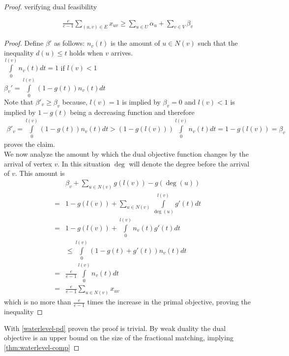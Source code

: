 \begin{proof}
	verifying dual feasibility\\
	\begin{lemma}
		\label{waterlevel-pd}
		\begin{align*}
			\frac{e}{e-1}\sum\limits_{(u,v)\in E}x_{uv} \geq \sum\limits_{u\in U}\alpha_u+\sum\limits_{v\in V}\beta_v
		\end{align*}
	\end{lemma}
	\begin{proof}
		Define $\beta'$ as follows: $n_v(t)$ is the amount of $u\in N(v)$ such that the inequality $d(u)\leq t$ holds when $v$ arrives.\\
		$\int\limits_0^{l(v)}n_v(t) dt=1$ if $l(v)<1$\\
		$\beta_v'=\int\limits_0^{l(v)}(1-g(t))n_v(t) dt$\\
		Note that $\beta'_v\geq\beta_v$ because, $l(v)=1$ is implied by $\beta_v=0$ and $l(v)<1$ is implied by $1-g(t)$ being a decreasing function and therefore\\
		\begin{align*}
			\beta'_v=\int\limits_0^{l(v)}(1-g(t))n_v(t) dt > (1-g(l(v)))\int\limits_0^{l(v)}n_v(t) dt= 1-g(l(v))=\beta_v
		\end{align*}
		proves the claim.\\
		We now analyze the amount by which the dual objective function changes by the arrival of vertex $v$. In this situation $\deg$ will denote the degree before the arrival of $v$. This amount is
		\begin{align*}
			&\beta_v+\sum\limits_{u\in N(v)}g(l(v))-g(\deg(u))\\
			=&1-g(l(v))+\sum\limits_{u\in N(v)}\int\limits_{\deg(u)}^{l(v)}g'(t)dt\\
			=&1-g(l(v))+\int\limits_{0}^{l(v)}n_v(t)g'(t)dt\\
			&\leq\int\limits_{0}^{l(v)}\left(1-g(t)+g'(t)\right)n_v(t)dt\\
			=&\frac{e}{e-1}\int\limits_0^{l(v)}n_v(t)dt\\
			=&\frac{e}{e-1}\sum\limits_{u\in N(v)}x_{uv}
		\end{align*}
		which is no more than $\frac{e}{e-1}$ times the increase in the primal objective, proving the inequality
	\end{proof}
	With \autoref{waterlevel-pd} proven the proof is trivial. By weak duality the dual objective is an upper bound on the size of the fractional matching, implying \autoref{thm:waterlevel-comp}
\end{proof}